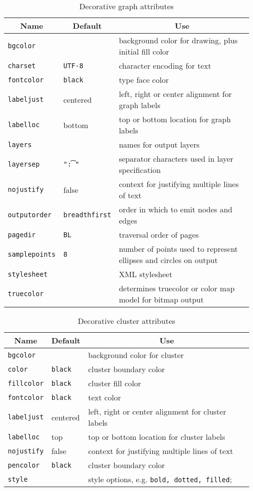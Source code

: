 \begin{table}[htbp]\footnotesize
\centering
\begin{tabular}[t]{|l|l|p{2.5in}|} \hline
\multicolumn{1}{|c|}{Name} & \multicolumn{1}{c|}{Default} & \multicolumn{1}{c|}{Use} \\ \hline
{\tt bgcolor} &  & background color for drawing, plus initial fill color \\
{\tt charset} & {\tt UTF-8} & character encoding for text \\ 
{\tt fontcolor} & {\tt black} & type face color \\ 
{\tt labeljust} & centered & left, right or center alignment for graph labels \\
{\tt labelloc} & bottom & top or bottom location for graph labels \\
{\tt layers} & & names for output layers \\
{\tt layersep} & {\tt "\t :" } & separator characters used in layer specification \\
{\tt nojustify} & false & context for justifying multiple lines of text \\
{\tt outputorder} & {\tt breadthfirst} & order in which to emit nodes and edges \\ 
{\tt pagedir} & {\tt BL} & traversal order of pages \\
{\tt samplepoints} & {\tt 8} & number of points used to represent ellipses
and circles on output \\
{\tt stylesheet} & & XML stylesheet \\
{\tt truecolor} & & determines truecolor or color map model for bitmap output \\
\hline
\end{tabular}
\caption{Decorative graph attributes}
\label{tab:gattr_dec}
\end{table}
\begin{table}[htbp]\footnotesize
\centering
\begin{tabular}[t]{|l|l|p{2.5in}|} \hline
\multicolumn{1}{|c|}{Name} & \multicolumn{1}{c|}{Default} & \multicolumn{1}{c|}{Use} \\ \hline
{\tt bgcolor} &  & background color for cluster \\
{\tt color} & {\tt black} & cluster boundary color \\
{\tt fillcolor} & {\tt black} & cluster fill color \\
{\tt fontcolor} & {\tt black} & text color \\
{\tt labeljust} & centered & left, right or center alignment for cluster labels \\
{\tt labelloc} & top & top or bottom location for cluster labels \\
{\tt nojustify} & false & context for justifying multiple lines of text \\
{\tt pencolor} & {\tt black} & cluster boundary color \\
{\tt style} & & style options, e.g. {\tt bold, dotted, filled}; \\ 
\hline
\end{tabular}
\caption{Decorative cluster attributes}
\label{tab:cattr_dec}
\end{table}

